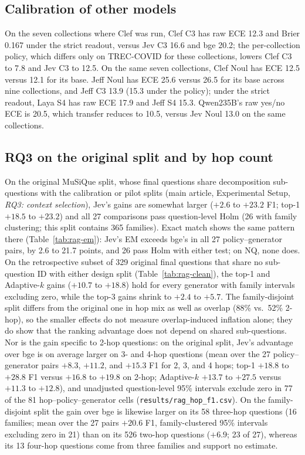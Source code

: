 \subsection{Calibration of other models}

On the seven collections where Clef was run, Clef C3 has raw ECE 12.3 and Brier 0.167 under the strict readout, versus Jev C3 16.6 and bge 20.2; the per-collection policy, which differs only on TREC-COVID for these collections, lowers Clef C3 to 7.8 and Jev C3 to 12.5. On the same seven collections, Clef Noul has ECE 12.5 versus 12.1 for its base. Jeff Noul has ECE 25.6 versus 26.5 for its base across nine collections, and Jeff C3 13.9 (15.3 under the policy); under the strict readout, Laya S4 has raw ECE 17.9 and Jeff S4 15.3. Qwen235B's raw yes/no ECE is 20.5, which transfer reduces to 10.5, versus Jev Noul 13.0 on the same collections.

\subsection{RQ3 on the original split and by hop count}

On the original MuSiQue split, whose final questions share decomposition sub-questions with the calibration or pilot splits (main article, Experimental Setup, \emph{RQ3: context selection}), Jev's gains are somewhat larger ($+2.6$ to $+23.2$ F1; top-1 $+18.5$ to $+23.2$) and all 27 comparisons pass question-level Holm (26 with family clustering; this split contains 365 families). Exact match shows the same pattern there (Table~\ref{tab:rag-em}): Jev's EM exceeds bge's in all 27 policy--generator pairs, by 2.6 to 21.7 points, and 26 pass Holm with either test; on NQ, none does. On the retrospective subset of 329 original final questions that share no sub-question ID with either design split (Table~\ref{tab:rag-clean}), the top-1 and Adaptive-$k$ gains ($+10.7$ to $+18.8$) hold for every generator with family intervals excluding zero, while the top-3 gains shrink to $+2.4$ to $+5.7$. The family-disjoint split differs from the original one in hop mix as well as overlap (88\% vs.\ 52\% 2-hop), so the smaller effects do not measure overlap-induced inflation alone; they do show that the ranking advantage does not depend on shared sub-questions. Nor is the gain specific to 2-hop questions: on the original split, Jev's advantage over bge is on average larger on 3- and 4-hop questions (mean over the 27 policy--generator pairs $+8.3$, $+11.2$, and $+15.3$ F1 for 2, 3, and 4 hops; top-1 $+18.8$ to $+28.8$ F1 versus $+16.8$ to $+19.8$ on 2-hop; Adaptive-$k$ $+13.7$ to $+27.5$ versus $+11.3$ to $+12.8$), and unadjusted question-level 95\% intervals exclude zero in 77 of the 81 hop--policy--generator cells (\texttt{results/rag\_hop\_f1.csv}). On the family-disjoint split the gain over bge is likewise larger on its 58 three-hop questions (16 families; mean over the 27 pairs $+20.6$ F1, family-clustered 95\% intervals excluding zero in 21) than on its 526 two-hop questions ($+6.9$; 23 of 27), whereas its 13 four-hop questions come from three families and support no estimate.

